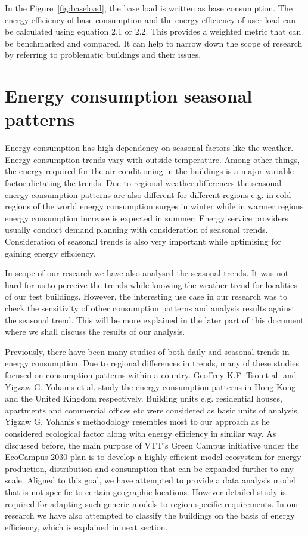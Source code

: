 In the Figure~\ref{fig:baseload}, the base load is written as base consumption. The energy efficiency of base consumption and the energy efficiency of user load can be calculated using equation 2.1 or 2.2. This provides a weighted metric that can be benchmarked and compared. It can help to narrow down the scope of research by referring to problematic buildings and their issues.

\section{Energy consumption seasonal patterns}\label{seasonal}
Energy consumption has high dependency on seasonal factors like the weather. Energy consumption trends vary with outside temperature. Among other things, the energy required for the air conditioning in the buildings is a major variable factor dictating the trends. Due to regional weather differences the seasonal energy consumption patterns are also different for different regions e.g. in cold regions of the world energy consumption surges in winter while in warmer regions energy consumption increase is expected in summer. Energy service providers usually conduct demand planning with consideration of seasonal trends. Consideration of seasonal trends is also very important while optimising for gaining energy efficiency. 

In scope of our research we have also analysed the seasonal trends. It was not hard for us to perceive the trends while knowing the weather trend for localities of our test buildings. However, the interesting use case in our research was to check the sensitivity of other consumption patterns and analysis results against the seasonal trend. This will be more explained in the later part of this document where we shall discuss the results of our analysis.

Previously, there have been many studies of both daily and seasonal trends in energy consumption. Due to regional differences in trends, many of these studies focused on consumption patterns within a country. Geoffrey K.F. Tso et al.\cite{tso2003study} and Yigzaw G. Yohanis et al.\cite{yohanis2008real} study the energy consumption patterns in  Hong Kong and the United Kingdom respectively. Building units e.g. residential houses, apartments and commercial offices etc were considered as basic units of analysis. Yigzaw G. Yohanis's methodology resembles most to our approach as he considered ecological factor along with energy efficiency in similar way. As discussed before, the main purpose of VTT's Green Campus initiative under the EcoCampus 2030 plan is to develop a highly efficient model ecosystem for energy production, distribution and consumption that can be expanded further to any scale. Aligned to this goal, we have attempted to provide a data analysis model that is not specific to certain geographic locations. However detailed study is required for adapting such generic models to region specific requirements. In our research we have also attempted to classify the buildings on the basis of energy efficiency, which is explained in next section.

